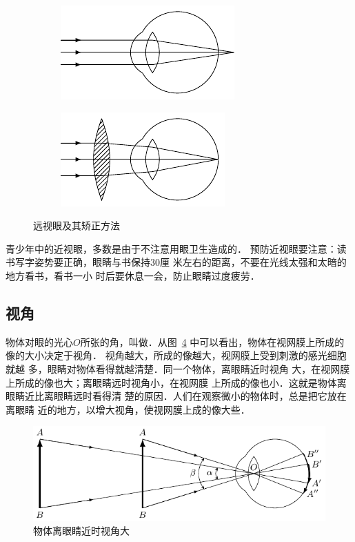 \begin{figure}[htbp]
    \centering
    \begin{subfigure}{0.4\linewidth}
        \centering
        \includegraphics{fig/C/5-51a.pdf}
        \caption{}\label{fig_C_5-51a}
    \end{subfigure}
    \hfil
    \begin{subfigure}{0.4\linewidth}
        \centering
        \includegraphics{fig/C/5-51b.pdf}
        \caption{}\label{fig_C_5-51b}
    \end{subfigure}
    \caption{远视眼及其矫正方法}\label{fig_C_5-51}
\end{figure}

青少年中的近视眼，多数是由于不注意用眼卫生造成的．
预防近视眼要注意：读书写字姿势要正确，眼睛与书保持30厘
米左右的距离，不要在光线太强和太暗的地方看书，看书一小
时后要休息一会，防止眼睛过度疲劳．

\subsection{视角}

物体对眼的光心$O$所张的角，叫做．从图~\ref{fig_C_5-52} 中可以看出，物体在视网膜上所成的像的大小决定于视角．
视角越大，所成的像越大，视网膜上受到刺激的感光细胞就越
多，眼睛对物体看得就越清楚．同一个物体，离眼睛近时视角
大，在视网膜上所成的像也大；离眼睛远时视角小，在视网膜
上所成的像也小．这就是物体离眼睛近比离眼睛远时看得清
楚的原因．人们在观察微小的物体时，总是把它放在离眼睛
近的地方，以增大视角，使视网膜上成的像大些．

\begin{figure}[htbp]
    \centering
    \includegraphics{fig/C/5-52.pdf}
    \caption{物体离眼睛近时视角大}\label{fig_C_5-52}
\end{figure}

